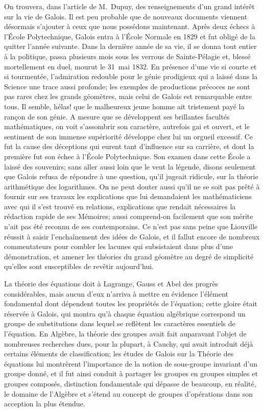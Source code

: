 \documentclass[leqno,12pt]{book}[2005/09/16]
\newcommand{\DPtypo}[2]{#2}
\begin{document}
On trouvera, dans l'article de M.~Dupuy, des renseignements
d'un grand intérêt sur la vie de Galois. Il est peu probable
que de nouveaux documents viennent désormais
s'ajouter à ceux que nous possédons maintenant. Après
deux échecs à l'École Polytechnique, Galois entra à l'École
Normale en 1829 et fut obligé de la quitter l'année suivante.
Dans la dernière année de sa vie, il se donna tout entier à la
politique, passa plusieurs mois sous les verrous de Sainte-Pélagie
et, blessé mortellement en duel, mourut le 31~mai
1832. En présence d'une vie si courte et si tourmentée, l'admiration
redouble pour le génie prodigieux qui a laissé dans
la Science une trace aussi profonde; les exemples de productions
précoces ne sont pas rares chez les grands géomètres,
mais celui de Galois est remarquable entre tous.
Il semble, hélas! que le malheureux jeune homme ait tristement
payé la rançon de son génie. A mesure que se \DPtypo{déveveloppent}{développent}
ses brillantes facultés mathématiques, on voit
s'assombrir son caractère, autrefois gai et ouvert, et le
sentiment de son immense supériorité développe chez lui un
orgueil excessif. Ce fut la cause des déceptions qui eurent
tant d'influence sur sa carrière, et dont la première fut son
échec à l'École Polytechnique. Son examen dans cette
École a laissé des souvenirs; sans aller aussi loin que le
veut la légende, disons seulement que Galois refusa de répondre
à une question, qu'il jugeait ridicule, sur la théorie
arithmétique des logarithmes. On ne peut douter aussi qu'il
ne se soit pas prêté à fournir sur ses travaux les explications
que lui demandaient les mathématiciens avec qui il s'est
trouvé en relations, explications que rendait nécessaires la
rédaction rapide de ses Mémoires; aussi comprend-on facilement
que son mérite n'ait pas été reconnu de ses contemporains.
Ce n'est pas sans peine que Liouville réussit à saisir
l'enchaînement des idées de Galois, et il fallut encore de
nombreux commentateurs pour combler les lacunes qui subsistaient
dans plus d'une démonstration, et amener les théories
du grand géomètre au degré de simplicité qu'elles sont
susceptibles de revêtir aujourd'hui.

La théorie des équations doit à Lagrange, Gauss et Abel
des progrès considérables, mais aucun d'eux n'arriva à
mettre en évidence l'élément fondamental dont dépendent
toutes les propriétés de l'équation; cette gloire était réservée
à Galois, qui montra qu'à chaque équation algébrique correspond
un groupe de substitutions dans lequel se reflètent
les caractères essentiels de l'équation. En Algèbre, la théorie
des groupes avait fait auparavant l'objet de nombreuses recherches
dues, pour la plupart, à Cauchy, qui avait introduit
déjà certains éléments de classification; les études de
Galois sur la Théorie des équations lui montrèrent l'importance
de la notion de sous-groupe invariant d'un groupe
donné, et il fut ainsi conduit à partager les groupes en
groupes simples et groupes composés, distinction fondamentale
qui dépasse de beaucoup, en réalité, le domaine de
l'Algèbre et s'étend au concept de groupes d'opérations dans
son acception la plus étendue.
\end{document}
